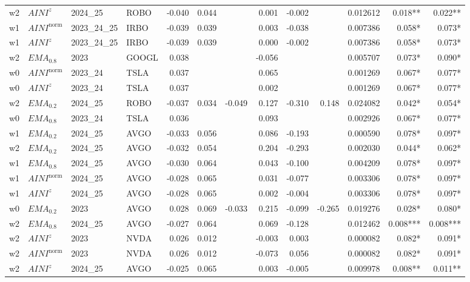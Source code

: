 \begin{longtable}{@{}llllrrrrrrrrr@{}}
w2 & $AINI^{z}$ & 2024\_25 & ROBO & -0.040 & 0.044 &  & 0.001 & -0.002 &  & 0.012612 & 0.018** & 0.022** \\
w1 & $AINI^{\mathrm{norm}}$ & 2023\_24\_25 & IRBO & -0.039 & 0.039 &  & 0.003 & -0.038 &  & 0.007386 & 0.058* & 0.073* \\
w1 & $AINI^{z}$ & 2023\_24\_25 & IRBO & -0.039 & 0.039 &  & 0.000 & -0.002 &  & 0.007386 & 0.058* & 0.073* \\
w2 & $EMA_{0.8}$ & 2023 & GOOGL & 0.038 &  &  & -0.056 &  &  & 0.005707 & 0.073* & 0.090* \\
w0 & $AINI^{\mathrm{norm}}$ & 2023\_24 & TSLA & 0.037 &  &  & 0.065 &  &  & 0.001269 & 0.067* & 0.077* \\
w0 & $AINI^{z}$ & 2023\_24 & TSLA & 0.037 &  &  & 0.002 &  &  & 0.001269 & 0.067* & 0.077* \\
w2 & $EMA_{0.2}$ & 2024\_25 & ROBO & -0.037 & 0.034 & -0.049 & 0.127 & -0.310 & 0.148 & 0.024082 & 0.042* & 0.054* \\
w0 & $EMA_{0.8}$ & 2023\_24 & TSLA & 0.036 &  &  & 0.093 &  &  & 0.002926 & 0.067* & 0.077* \\
w1 & $EMA_{0.2}$ & 2024\_25 & AVGO & -0.033 & 0.056 &  & 0.086 & -0.193 &  & 0.000590 & 0.078* & 0.097* \\
w2 & $EMA_{0.2}$ & 2024\_25 & AVGO & -0.032 & 0.054 &  & 0.204 & -0.293 &  & 0.002030 & 0.044* & 0.062* \\
w1 & $EMA_{0.8}$ & 2024\_25 & AVGO & -0.030 & 0.064 &  & 0.043 & -0.100 &  & 0.004209 & 0.078* & 0.097* \\
w1 & $AINI^{\mathrm{norm}}$ & 2024\_25 & AVGO & -0.028 & 0.065 &  & 0.031 & -0.077 &  & 0.003306 & 0.078* & 0.097* \\
w1 & $AINI^{z}$ & 2024\_25 & AVGO & -0.028 & 0.065 &  & 0.002 & -0.004 &  & 0.003306 & 0.078* & 0.097* \\
w0 & $EMA_{0.2}$ & 2023 & AVGO & 0.028 & 0.069 & -0.033 & 0.215 & -0.099 & -0.265 & 0.019276 & 0.028* & 0.080* \\
w2 & $EMA_{0.8}$ & 2024\_25 & AVGO & -0.027 & 0.064 &  & 0.069 & -0.128 &  & 0.012462 & 0.008*** & 0.008*** \\
w2 & $AINI^{z}$ & 2023 & NVDA & 0.026 & 0.012 &  & -0.003 & 0.003 &  & 0.000082 & 0.082* & 0.091* \\
w2 & $AINI^{\mathrm{norm}}$ & 2023 & NVDA & 0.026 & 0.012 &  & -0.073 & 0.056 &  & 0.000082 & 0.082* & 0.091* \\
w2 & $AINI^{z}$ & 2024\_25 & AVGO & -0.025 & 0.065 &  & 0.003 & -0.005 &  & 0.009978 & 0.008** & 0.011** \\

\end{longtable}
